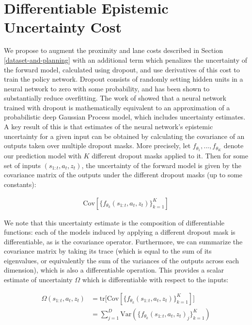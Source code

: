 \documentclass{article} %
\begin{document}
    \section{Differentiable Epistemic Uncertainty Cost}
    \label{uncertainty-cost}

    We propose to augment the proximity and lane costs described in Section \ref{dataset-and-planning} with an additional term which penalizes the uncertainty of the forward model, calculated using dropout, and use derivatives of this cost to train the policy network.
    Dropout \citep{Dropout2012, Dropout2014} consists of randomly setting hidden units in a neural network to zero with some probability, and has been shown to substantially reduce overfitting.
    The work of \citep{Gal16} showed that a neural network trained with dropout is mathematically equivalent to an approximation of a probabilistic deep Gaussian Process model, which includes uncertainty estimates.
    A key result of this is that estimates of the neural network's epistemic uncertainty for a given input can be obtained by calculating the covariance of an outputs taken over multiple dropout masks.
    More precisely, let $f_{\theta_1}, ..., f_{\theta_K}$ denote our prediction model with $K$ different dropout masks applied to it.
    Then for some set of inputs $(s_{1:t}, a_t, z_t)$, the uncertainty of the forward model is given by the covariance matrix of the outputs under the different dropout masks (up to some constants):

    \begin{align}
      \mbox{Cov} [\{ f_{\theta_k}(s_{1:t}, a_t, z_t) \}_{k=1}^K]
    \end{align}

    We note that this uncertainty estimate is the composition of differentiable functions: each of the models induced by applying a different dropout mask is differentiable, as is the covariance operator.
    Furthermore, we can summarize the covariance matrix by taking its trace (which is equal to the sum of its eigenvalues, or equivalently the sum of the variances of the outputs across each dimension), which is also a differentiable operation. This provides a scalar estimate of uncertainty $\Omega$ which is differentiable with respect to the inputs:

    \begin{align*}
      \Omega(s_{1:t}, a_t, z_t) &= \mbox{tr} \Big[ \mbox{Cov} [\{ f_{\theta_k}(s_{1:t}, a_t, z_t) \}_{k=1}^K] \Big] \\
      &= \sum_{j=1}^D \mbox{Var}(\{ f_{\theta_k}(s_{1:t}, a_t, z_t)_j \}_{k=1}^K)
    \end{align*}
\end{document}
